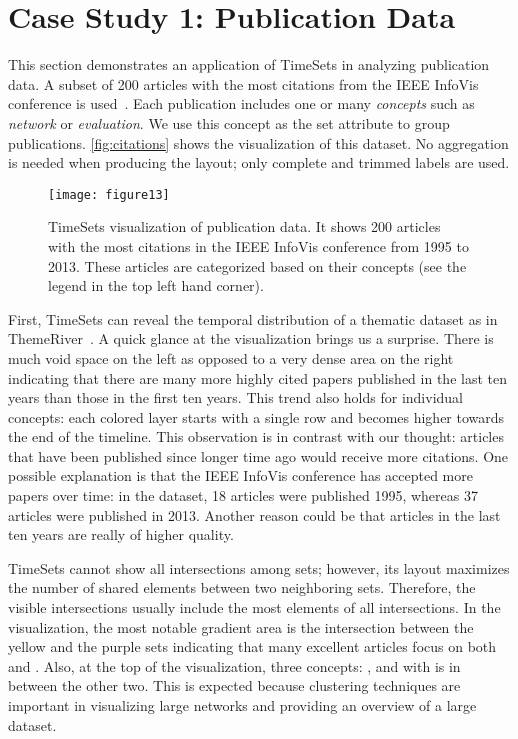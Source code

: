 \section{Case Study 1: Publication Data}
This section demonstrates an application of TimeSets in analyzing publication data. A subset of 200 articles with the most citations from the IEEE InfoVis conference is used~\cite{Stasko2013}. Each publication includes one or many \emph{concepts} such as \emph{network} or \emph{evaluation}. We use this concept as the set attribute to group publications. \autoref{fig:citations} shows the visualization of this dataset. No aggregation is needed when producing the layout; only complete and trimmed labels are used.

\begin{figure}[!htb]
\centering
\texttt{[image: figure13]}
\caption{TimeSets visualization of publication data. It shows 200 articles with the most citations in the IEEE InfoVis conference from 1995 to 2013. These articles are categorized based on their concepts (see the legend in the top left hand corner).}
\label{fig:citations}
\end{figure}

First, TimeSets can reveal the temporal distribution of a thematic dataset as in ThemeRiver~\cite{Havre2002}. A quick glance at the visualization brings us a surprise. There is much void space on the left as opposed to a very dense area on the right indicating that there are many more highly cited papers published in the last ten years than those in the first ten years. This trend also holds for individual concepts: each colored layer starts with a single row and becomes higher towards the end of the timeline. This observation is in contrast with our thought: articles that have been published since longer time ago would receive more citations. One possible explanation is that the IEEE InfoVis conference has accepted more papers over time: in the dataset, 18 articles were published 1995, whereas 37 articles were published in 2013. Another reason could be that articles in the last ten years are really of higher quality.

TimeSets cannot show all intersections among sets; however,  its layout maximizes the number of shared elements between two neighboring sets. Therefore, the visible intersections usually include the most elements of all intersections. In the visualization, the most notable gradient area is the intersection between the yellow and the purple sets indicating that many excellent articles focus on both \tsevaluation{} and \tsinteraction. Also, at the top of the visualization, three concepts: \tsnetwork, \tsclustering{} and \tsoverview{} with \tsclustering{} is in between the other two. This is expected because clustering techniques are important in visualizing large networks and providing an  overview of a large dataset.

